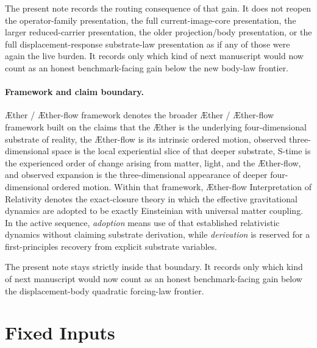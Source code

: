 \documentclass[11pt]{article}
\newcommand{\Aether}{\AE{}ther}
\newcommand{\Aflow}{\AE{}ther-flow}
\newcommand{\TheoryName}{\Aflow{} Interpretation of Relativity}
\newcommand{\TheoryProgram}{\Aether{} / \Aflow{} framework}
\begin{document}
The present note records the routing consequence of that gain. It does not reopen the operator-family presentation, the full current-image-core presentation, the larger reduced-carrier presentation, the older projection/body presentation, or the full displacement-response substrate-law presentation as if any of those were again the live burden. It records only which kind of next manuscript would now count as an honest benchmark-facing gain below the new body-law frontier.

\paragraph{Framework and claim boundary.}
\TheoryProgram{} denotes the broader \Aether{} / \Aflow{} framework built on the claims that the \Aether{} is the underlying four-dimensional substrate of reality, the \Aflow{} is its intrinsic ordered motion, observed three-dimensional space is the local experiential slice of that deeper substrate, S-time is the experienced order of change arising from matter, light, and the \Aflow{}, and observed expansion is the three-dimensional appearance of deeper four-dimensional ordered motion. Within that framework, \TheoryName{} denotes the exact-closure theory in which the effective gravitational dynamics are adopted to be exactly Einsteinian with universal matter coupling. In the active sequence, \emph{adoption} means use of that established relativistic dynamics without claiming substrate derivation, while \emph{derivation} is reserved for a first-principles recovery from explicit substrate variables.

The present note stays strictly inside that boundary. It records only which kind of next manuscript would now count as an honest benchmark-facing gain below the displacement-body quadratic forcing-law frontier.

\section{Fixed Inputs}
\end{document}
